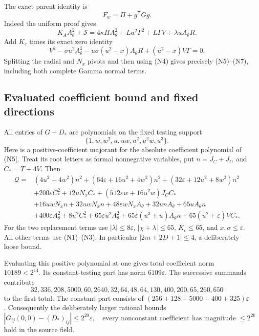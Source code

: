 \documentclass[11pt]{article}
\newcommand{\eps}{\varepsilon}
\begin{document}
The exact parent identity is
\[
                     F_w=\Pi+g^{\mathsf T}Gg.             \tag{N7}
\]
Indeed the uniform proof gives
\[
 K_AA_\theta^2+\mathscr S
 =4\kappa H A_\theta^2+Lu^2\Gamma^2+L\Gamma V
                                      +\lambda uA_\theta R.
\]
Add $K_c$ times its exact zero identity
\[
 V^2-\sigma u^2A_\theta^2
 -u\sigma(u^2-x)A_\theta R+(u^2-x)V\Gamma=0.
\]
Splitting the radial and $N_x$ pivots and then using (N4) gives
precisely (N5)--(N7), including both complete Gamma normal terms.

\subsection{Evaluated coefficient bound and fixed directions}

All entries of $G-D_*$ are polynomials on the fixed testing support
\[
 \{1,w,w^2,u,uw,u^2,u^2w,u^3\}.                 \tag{N8}
\]
Here is a positive-coefficient majorant for the absolute coefficient
polynomial of (N5). Treat its root letters as formal nonnegative
variables, put $n=J_C+J_\ell$, and $C_*=T+4V$. Then
\[
\begin{split}
 \mathcal Q={}&(4u^2+4w^2)n^2
 +(64\eps+16u^2+4w^2)n^2
 +(32\eps+12u^2+8w^2)n^2\\
 &+200\eps C_*^2+12uN_xC_*
 +(512\eps w+16u^2w)J_CC_*\\
 &+16uwN_xn+32uwN_xn+48\eps wN_xA_\theta
 +32unA_\theta+65uA_\theta n\\
 &+400\eps A_\theta^2+8u^2C_*^2
 +65\eps u^2A_\theta^2
 +65\eps(u^3+u)A_\theta n
 +65(u^2+\eps)VC_* .
\end{split}                                                   \tag{N9}
\]
For the two replacement terms use $|\lambda|\le8\eps$,
$|\chi+\lambda|\le65$, $K_c\le65$, and $x,\sigma\le\eps$.
All other terms use (N1)--(N3). In particular
$|2m+2D+1|\le4$, a deliberately loose bound.

Evaluating this positive polynomial at one gives total coefficient
norm $10189<2^{14}$. Its constant-testing part has norm
$6109\eps$. The successive summands contribute
\[
32,336,208,5000,60,2640,32,64,48,64,130,400,200,65,260,650
\]
to the first total. The constant part consists of
$(256+128+5000+400+325)\eps$.
Consequently the deliberately larger rational bounds
\[
 |G_{ij}(0,0)-(D_*)_{ij}|\le2^{20}\eps,
 \quad\text{every nonconstant coefficient has magnitude }\le2^{20}
                                                               \tag{N10}
\]
hold in the source field.
\end{document}

